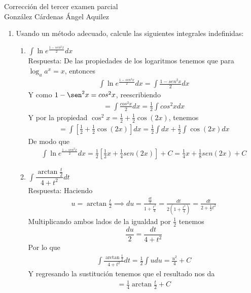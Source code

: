 \documentclass[a4paper,12pt]{report}
\begin{document}
\begin{center}
\Huge{Corrección del tercer examen parcial}\\
\vspace{0.5cm}
\Large{González Cárdenas Ángel Aquilez} \\
\end{center}

\vspace{0.5cm}


\begin{enumerate}
\centering
	\item Usando un método adecuado, calcule las siguientes integrales indefinidas:
	\begin{enumerate}
		\item
		\(\int \ln e^{\frac{1 - sen^2 x}{2}} dx\) 
		\\ \vspace{0.5cm}
		Respuesta: De las propiedades de los logaritmos tenemos que para \(\log_a a^x = x\), entonces
		\begin{align*}
			\int \ln e^{\frac{1 - sen^2 x}{2}} dx = \int \frac{1 - sen^2 x}{2} dx
		\end{align*}
		Y como \( 1 - \sen^2 x = cos^2 x \), reescribiendo
		\begin{align*}
			 = \int \frac{cos^2 x}{2} dx = \frac{1}{2} \int cos^2 x dx
		\end{align*}
		Y por la propiedad \(\cos^2 x = \frac{1}{2} + \frac{1}{2}\cos(2x)\), tenemos
		\begin{align*}
			 = \int [ \frac{1}{2} + \frac{1}{2}\cos(2x) ]dx = \frac{1}{2} \int dx + \frac{1}{2} \int \cos(2x) dx
		\end{align*}
		De modo que
		\begin{align*}
			\int \ln e^{\frac{1 - sen^2 x}{2}} dx = \frac{1}{2}[\frac{1}{2} x + \frac{1}{4} sen (2x)] + C =\frac{1}{4} x + \frac{1}{8} sen (2x) + C
		\end{align*}

		\item
		\(\int \dfrac{\arctan \frac{t}{2}}{4 + t^2} dt\)
		\\ \vspace{0.5cm}
		Respuesta: Haciendo 
		\begin{align*}
			u= \arctan \frac{t}{2} \implies du=\frac{\frac{dt}{2}}{1 + \frac{t^2}{4}} = \frac{dt}{2(1+ \frac{t^2}{4})} = \frac{dt}{2 + \frac{1}{2} t^2}
		\end{align*}
		Multiplicando ambos lados de la igualdad por $\frac{1}{2}$ tenemos
		\[ \frac{du}{2} = \frac{dt}{4 + t^2}\]
		Por lo que
		\begin{align*}
			\int \frac{\arctan \frac{t}{2}}{4 + t^2} dt = \frac{1}{2} \int udu = \frac{u^2}{4} + C
		\end{align*}
		Y regresando la sustitución tenemos que el resultado nos da
		\begin{align*}
			 = \frac{1}{4} \arctan \frac{t}{2} + C
		\end{align*}


\end{enumerate}
\end{enumerate}
\end{document}
